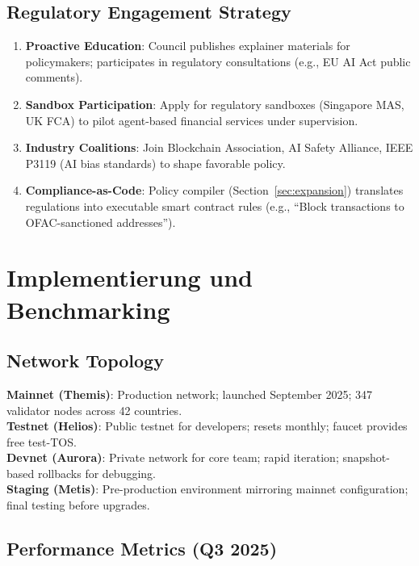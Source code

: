 \documentclass[11pt]{article}
\begin{document}
\subsection{Regulatory Engagement Strategy}

\begin{enumerate}[noitemsep]
  \item \textbf{Proactive Education}: Council publishes explainer materials for policymakers; participates in regulatory consultations (e.g., EU AI Act public comments).
  \item \textbf{Sandbox Participation}: Apply for regulatory sandboxes (Singapore MAS, UK FCA) to pilot agent-based financial services under supervision.
  \item \textbf{Industry Coalitions}: Join Blockchain Association, AI Safety Alliance, IEEE P3119 (AI bias standards) to shape favorable policy.
  \item \textbf{Compliance-as-Code}: Policy compiler (Section~\ref{sec:expansion}) translates regulations into executable smart contract rules (e.g., ``Block transactions to OFAC-sanctioned addresses'').
\end{enumerate}

\section{Implementierung und Benchmarking}
\label{sec:implementation}

\subsection{Network Topology}

\textbf{Mainnet (Themis)}: Production network; launched September 2025; 347 validator nodes across 42 countries.\\
\textbf{Testnet (Helios)}: Public testnet for developers; resets monthly; faucet provides free test-TOS.\\
\textbf{Devnet (Aurora)}: Private network for core team; rapid iteration; snapshot-based rollbacks for debugging.\\
\textbf{Staging (Metis)}: Pre-production environment mirroring mainnet configuration; final testing before upgrades.

\subsection{Performance Metrics (Q3 2025)}
\end{document}
